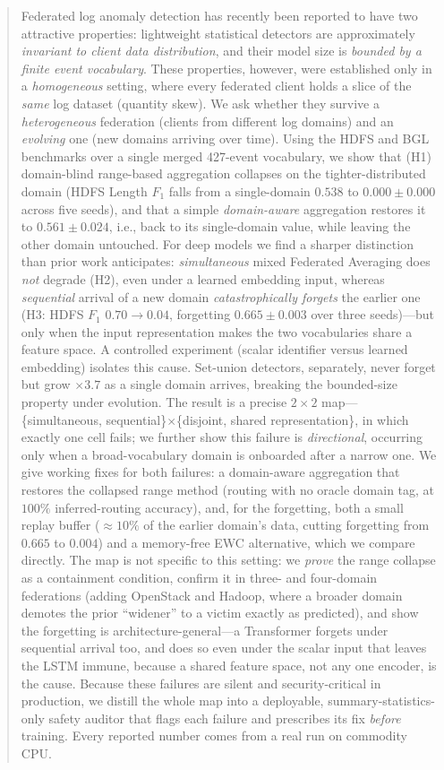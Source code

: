 \documentclass[journal]{IEEEtran}
\begin{document}
\begin{abstract}
Federated log anomaly detection has recently been reported to have two attractive
properties: lightweight statistical detectors are approximately \emph{invariant to client
data distribution}, and their model size is \emph{bounded by a finite event vocabulary}.
These properties, however, were established only in a \emph{homogeneous} setting, where every
federated client holds a slice of the \emph{same} log dataset (quantity skew). We ask whether
they survive a \emph{heterogeneous} federation (clients from different log domains) and an
\emph{evolving} one (new domains arriving over time). Using the HDFS and BGL benchmarks over a
single merged 427-event vocabulary, we show that (H1) domain-blind range-based aggregation
collapses on the tighter-distributed domain (HDFS Length $F_1$ falls from a single-domain
$0.538$ to $0.000\pm0.000$ across five seeds), and that a simple \emph{domain-aware}
aggregation restores it to $0.561\pm0.024$, i.e., back to its single-domain value, while
leaving the other domain untouched. For deep models we find a sharper distinction than prior
work anticipates: \emph{simultaneous} mixed Federated Averaging does \emph{not} degrade (H2),
even under a learned embedding input, whereas \emph{sequential} arrival of a new domain
\emph{catastrophically forgets} the earlier one (H3: HDFS $F_1$ $0.70\!\rightarrow\!0.04$,
forgetting $0.665\pm0.003$ over three seeds)---but only when the input representation makes the
two vocabularies share a feature space. A controlled experiment (scalar identifier versus
learned embedding) isolates this cause. Set-union detectors, separately, never forget but grow
$\times3.7$ as a single domain arrives, breaking the bounded-size property under evolution. The
result is a precise $2\times2$ map---\{simultaneous, sequential\}$\times$\{disjoint, shared
representation\}, in which exactly one cell fails; we further show this failure is \emph{directional},
occurring only when a broad-vocabulary domain is onboarded after a narrow one. We give working fixes
for both failures: a domain-aware aggregation that restores the collapsed range method (routing with no
oracle domain tag, at $100\%$ inferred-routing accuracy), and, for the forgetting, both a small replay
buffer ($\approx10\%$ of the earlier domain's data, cutting forgetting from $0.665$ to $0.004$) and a
memory-free EWC alternative, which we compare directly. The map is not specific to this setting: we
\emph{prove} the range collapse as a containment condition, confirm it in three- and four-domain
federations (adding OpenStack and Hadoop, where a broader domain demotes the prior ``widener'' to a
victim exactly as predicted), and show the forgetting is architecture-general---a Transformer forgets under
sequential arrival too, and does so even under the scalar input that leaves the LSTM immune, because a
shared feature space, not any one encoder, is the cause. Because these failures are silent and
security-critical in production, we distill the whole map into a deployable, summary-statistics-only
safety auditor that flags each failure and prescribes its fix \emph{before} training. Every reported
number comes from a real run on commodity CPU.
\end{abstract}
\end{document}
